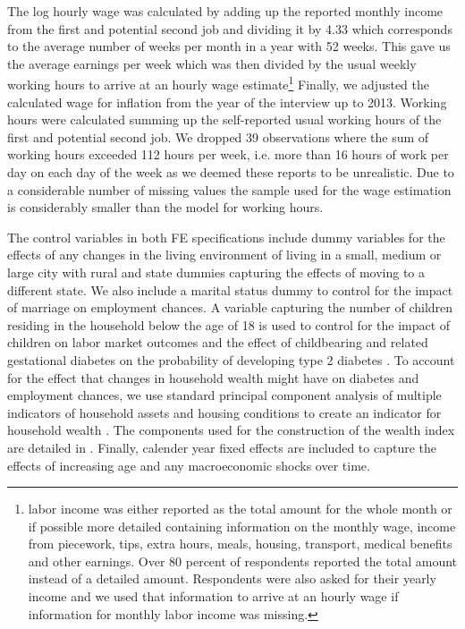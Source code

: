 \documentclass[12pt,english,british]{article}
\begin{document}
The log hourly wage was calculated by adding up the reported monthly
income from the first and potential second job and dividing it by
4.33 which corresponds to the average number of weeks per month in
a year with 52 weeks. This gave us the average earnings per week which
was then divided by the usual weekly working hours to arrive at an
hourly wage estimate\footnote{labor income was either reported as the total amount for the whole
month or if possible more detailed containing information on the monthly
wage, income from piecework, tips, extra hours, meals, housing, transport,
medical benefits and other earnings. Over 80 percent of respondents
reported the total amount instead of a detailed amount. Respondents
were also asked for their yearly income and we used that information
to arrive at an hourly wage if information for monthly labor income
was missing.} Finally, we adjusted the calculated wage for inflation from the year
of the interview up to 2013. Working hours were calculated summing
up the self-reported usual working hours of the first and potential
second job. We dropped 39 observations where the sum of working hours
exceeded 112 hours per week, i.e. more than 16 hours of work per day
on each day of the week as we deemed these reports to be unrealistic.
Due to a considerable number of missing values the sample used for the wage estimation is considerably smaller than the model for working hours.

The control variables in both \ac{FE} specifications include dummy variables for the effects of any changes in the living environment
of living in a small, medium or large city with rural and state
dummies capturing the effects of moving to a different state. We also include a marital
status dummy to control for the impact of marriage on employment chances.
A variable capturing the number of children residing in the household
below the age of 18 is used to control for the impact of children
on labor market outcomes and the effect of childbearing and related
gestational diabetes on the probability of developing type 2 diabetes
\citep{Bellamy2009}. To account for the effect that changes in household
wealth might have on diabetes and employment chances, we use standard
principal component analysis of multiple indicators of household assets
and housing conditions to create an indicator for household wealth
\citep{Filmer2001}. The components used for the construction of the
wealth index are detailed in \citet{Seuring2015}. Finally, calender year fixed effects are included to capture the effects of increasing age and any macroeconomic shocks over time.
\end{document}
